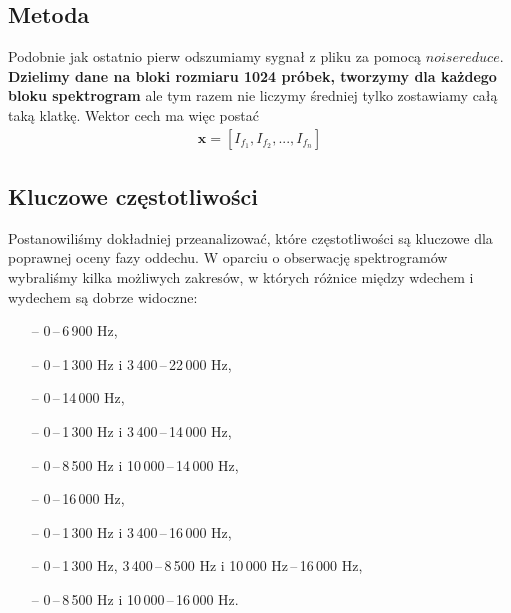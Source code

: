 \documentclass[polish]{article}
\begin{document}
\subsection{Metoda}
Podobnie jak ostatnio pierw odszumiamy sygnał z pliku za pomocą $noisereduce$. \textbf{Dzielimy dane na bloki
rozmiaru 1024 próbek, tworzymy dla każdego bloku spektrogram} ale tym razem nie liczymy średniej tylko zostawiamy całą taką klatkę. Wektor cech ma więc postać 
\begin{gather*}
\boldsymbol{x} = [I_{f_1}, I_{f_2}, ..., I_{f_n}]
\end{gather*}
\subsection{Kluczowe częstotliwości}
Postanowiliśmy dokładniej przeanalizować, które częstotliwości są kluczowe dla poprawnej oceny fazy oddechu. W oparciu o obserwację spektrogramów wybraliśmy kilka możliwych zakresów, w których różnice między wdechem i wydechem są dobrze widoczne:
\begin{itemize}
	\setlength\itemsep{-0.25em}
	\item[--] 0\,--\,6\,900 \unit{Hz},
	\item[--] 0\,--\,1\,300 \unit{Hz} i 3\,400\,--\,22\,000 \unit{Hz},
	\item[--] 0\,--\,14\,000 \unit{Hz},
	\item[--] 0\,--\,1\,300 \unit{Hz} i 3\,400\,--\,14\,000 \unit{Hz},
	\item[--] 0\,--\,8\,500 \unit{Hz} i 10\,000\,--\,14\,000 \unit{Hz},
	\item[--] 0\,--\,16\,000 \unit{Hz},
	\item[--] 0\,--\,1\,300 \unit{Hz} i 3\,400\,--\,16\,000 \unit{Hz},
	\item[--] 0\,--\,1\,300 \unit{Hz}, 3\,400\,--\,8\,500 \unit{Hz} i 10\,000 \unit{Hz}\,--\,16\,000 \unit{Hz},
	\item[--] 0\,--\,8\,500 \unit{Hz} i 10\,000\,--\,16\,000 \unit{Hz}.
\end{itemize}
\end{document}
